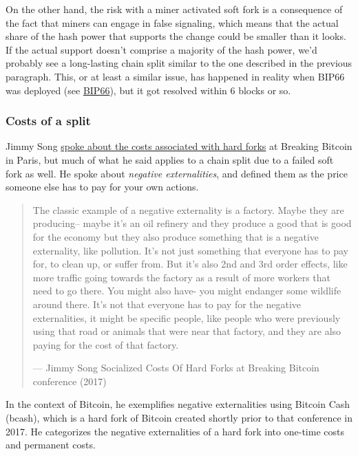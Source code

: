 On the other hand, the risk with a miner activated soft fork is a
consequence of the fact that miners can engage in false signaling, which
means that the actual share of the hash power that supports the change
could be smaller than it looks. If the actual support doesn't comprise a
majority of the hash power, we'd probably see a long-lasting chain split
similar to the one described in the previous paragraph. This, or at
least a similar issue, has happened in reality when BIP66 was deployed
(see \protect\hyperlink{bip66-splits}{BIP66}), but it got resolved
within 6 blocks or so.

\hypertarget{_costs_of_a_split}{%
\subsubsection{Costs of a split}\label{_costs_of_a_split}}

Jimmy Song
\href{https://btctranscripts.com/breaking-bitcoin/2017/socialized-costs-of-hard-forks/}{spoke
about the costs associated with hard forks} at Breaking Bitcoin in
Paris, but much of what he said applies to a chain split due to a failed
soft fork as well. He spoke about \emph{negative externalities}, and
defined them as the price someone else has to pay for your own actions.

\begin{quote}
The classic example of a negative externality is a factory. Maybe they
are producing-- maybe it's an oil refinery and they produce a good that
is good for the economy but they also produce something that is a
negative externality, like pollution. It's not just something that
everyone has to pay for, to clean up, or suffer from. But it's also 2nd
and 3rd order effects, like more traffic going towards the factory as a
result of more workers that need to go there. You might also have- you
might endanger some wildlife around there. It's not that everyone has to
pay for the negative externalities, it might be specific people, like
people who were previously using that road or animals that were near
that factory, and they are also paying for the cost of that factory.

---  Jimmy Song Socialized Costs Of Hard Forks at Breaking Bitcoin
conference (2017)
\end{quote}

In the context of Bitcoin, he exemplifies negative externalities using
Bitcoin Cash (bcash), which is a hard fork of Bitcoin created shortly
prior to that conference in 2017. He categorizes the negative
externalities of a hard fork into one-time costs and permanent costs.

